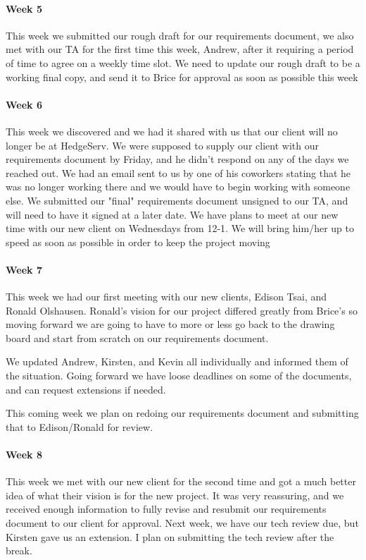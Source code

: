 \documentclass{article}
\begin{document}
\paragraph{Week 5}
This week we submitted our rough draft for our requirements document, we also met with our TA for the first time this week, Andrew, after it requiring a period of time to agree on a weekly time slot. We need to update our rough draft to be a working final copy, and send it to Brice for approval as soon as possible this week 
\paragraph{Week 6}
This week we discovered and we had it shared with us that our client will no longer be at HedgeServ. We were supposed to supply our client with our requirements document by Friday, and he didn't respond on any of the days we reached out. We had an email sent to us by one of his coworkers stating that he was no longer working there and we would have to begin working with someone else. We submitted our "final" requirements document unsigned to our TA, and will need to have it signed at a later date. We have plans to meet at our new time with our new client on Wednesdays from 12-1. We will bring him/her up to speed as soon as possible in order to keep the project moving 
\paragraph{Week 7}
This week we had our first meeting with our new clients, Edison Tsai, and Ronald Olshausen. Ronald's vision for our project differed greatly from Brice's so moving forward we are going to have to more or less go back to the drawing board and start from scratch on our requirements document. 
 
We updated Andrew, Kirsten, and Kevin all individually and informed them of the situation. Going forward we have loose deadlines on some of the documents, and can request extensions if needed. 
 
This coming week we plan on redoing our requirements document and submitting that to Edison/Ronald for review. 
\paragraph{Week 8}
This week we met with our new client for the second time and got a much better idea of what their vision is for the new project. It was very reassuring, and we received enough information to fully revise and resubmit our requirements document to our client for approval. Next week, we have our tech review due, but Kirsten gave us an extension. I plan on submitting the tech review after the break. 
\end{document}
